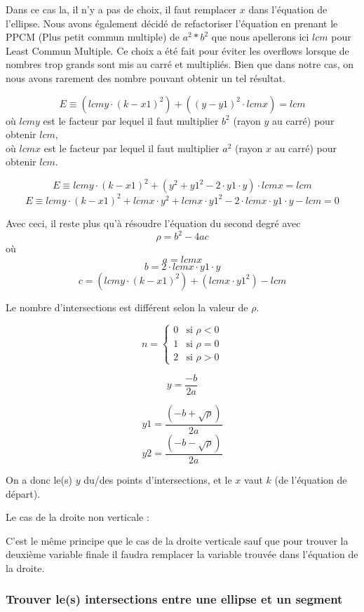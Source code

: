 \documentclass[]{article}
\begin{document}
Dans ce cas la, il n'y a pas de choix, il faut remplacer
$x$ dans l'équation de l'ellipse.
Nous avons également décidé de refactoriser l'équation en 
prenant le PPCM (Plus petit commun multiple) de $a^2 * b^2$ que
nous apellerons ici $lcm$ pour Least Commun Multiple.
Ce choix a été fait pour éviter les overflows lorsque 
de nombres trop grands sont mis au carré et multipliés.
Bien que dans notre cas, on nous avons rarement des nombre
pouvant obtenir un tel résultat.

$$ E \equiv (lcmy \cdot (k - x1)^2) + ((y - y1)^2 \cdot lcmx) = lcm $$  
où $lcmy$ est le facteur par lequel il faut multiplier
$b^2$ (rayon $y$ au carré) pour obtenir $lcm$, \\
où $lcmx$ est le facteur par lequel il faut multiplier
$a^2$ (rayon $x$ au carré) pour obtenir $lcm$.

$$ E \equiv lcmy \cdot (k-x1)^2 + (y^2 + y1^2 - 2 \cdot y1 \cdot y)
\cdot lcmx = lcm$$
$$ E \equiv lcmy \cdot (k-x1)^2 + lcmx \cdot y^2 + lcmx \cdot
y1^2 - 2 \cdot lcmx \cdot y1 \cdot y - lcm = 0 $$

Avec ceci, il reste plus qu'à résoudre l'équation du second degré 
avec 
$$ \rho = b^2 - 4ac$$
où $$ a = lcmx $$
$$ b = 2 \cdot lcmx \cdot y1 \cdot y $$
$$ c = (lcmy \cdot (k-x1)^2) + (lcmx \cdot y1^2) - lcm $$



Le nombre d'intersections est différent selon la valeur de $\rho$.

\[
	n =
	\begin{cases}
		0 & \text{si } \rho < 0 \\
		1 & \text{si } \rho = 0 \\
		2 & \text{si } \rho > 0  
	\end{cases}
\]

$$ y = \frac {-b}{2a} $$

$$ y1 = \frac{(-b + \sqrt{\rho})}{2a} $$
$$ y2 = \frac{(-b - \sqrt{\rho})}{2a} $$

On a donc le(s) $y$ du/des points d'intersections, et le $x$
vaut $k$ (de l'équation de départ).



Le cas de la droite non verticale : 


C'est le même principe que le cas de la droite verticale sauf
que pour trouver la deuxième variable finale il faudra
remplacer la variable trouvée dans l'équation de la droite.

\subsubsection{Trouver le(s) intersections entre une ellipse et un segment}
\end{document}
